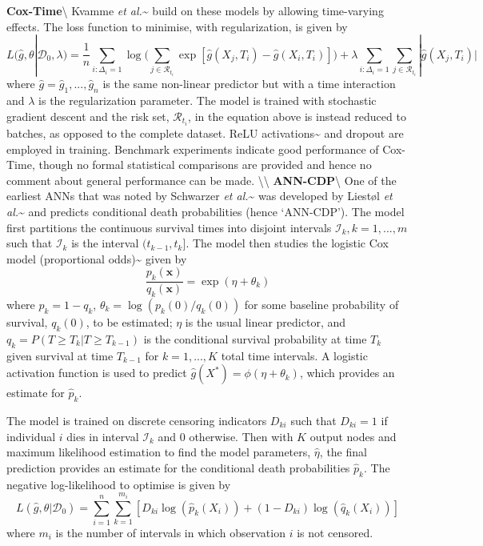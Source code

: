 \documentclass[
  letterpaper,
]{scrbook}
\theoremstyle{plain}
\theoremstyle{definition}
\theoremstyle{remark}
\begin{document}
\newpage

\noindent\textbf{Cox-Time}\label{mod:coxtime}\textbackslash{} Kvamme
\textit{et al.}{}\textasciitilde{}\cite{Kvamme2019a} build on these
models by allowing time-varying effects. The loss function to minimise,
with regularization, is given by \[
L(\hat{g}, \theta|\mathcal{D}_0, \lambda) = \frac{1}{n} \sum_{i:\Delta_i = 1} \log\Big(\sum_{j \in \mathcal{R}_{t_i}} \exp[\hat{g}(X_j,T_i) - \hat{g}(X_i, T_i)]\Big) + \lambda \sum_{i:\Delta_i=1}\sum_{j \in \mathcal{R}_{t_i}} |\hat{g}(X_j,T_i)|
\] where \(\hat{g}= \hat{g}_1,...,\hat{g}_n\) is the same non-linear
predictor but with a time interaction and \(\lambda\) is the
regularization parameter. The model is trained with stochastic gradient
descent and the risk set, \(\mathcal{R}_{t_i}\), in the equation above
is instead reduced to batches, as opposed to the complete dataset. ReLU
activations\textasciitilde{}\cite{Nair2010} and dropout are employed in
training. Benchmark experiments indicate good performance of Cox-Time,
though no formal statistical comparisons are provided and hence no
comment about general performance can be made.
\textbackslash\textbackslash{}
\textbf{ANN-CDP}\label{mod:anncdp}\textbackslash{} One of the earliest
ANNs that was noted by Schwarzer
\textit{et al.}\textasciitilde{}\cite{Schwarzer2000} was developed by
Liest\o l \textit{et al.}\textasciitilde{}\cite{Liestol1994} and
predicts conditional death probabilities (hence `ANN-CDP'). The model
first partitions the continuous survival times into disjoint intervals
\(\mathcal{I}_k, k = 1,...,m\) such that \(\mathcal{I}_k\) is the
interval \((t_{k-1}, t_k]\). The model then studies the logistic Cox
model (proportional odds)\textasciitilde{}\cite{Cox1972} given by \[
\frac{p_k(\mathbf{x})}{q_k(\mathbf{x})} = \exp(\eta + \theta_k)
\] where \(p_k = 1-q_k\), \(\theta_k = \log(p_k(0)/q_k(0))\) for some
baseline probability of survival, \(q_k(0)\), to be estimated; \(\eta\)
is the usual linear predictor, and
\(q_k = P(T \geq T_k | T \geq T_{k-1})\) is the conditional survival
probability at time \(T_k\) given survival at time \(T_{k-1}\) for
\(k = 1,...,K\) total time intervals. A logistic activation function is
used to predict \(\hat{g}(X^*) = \phi(\eta + \theta_k)\), which provides
an estimate for \(\hat{p}_k\).

The model is trained on discrete censoring indicators \(D_{ki}\) such
that \(D_{ki} = 1\) if individual \(i\) dies in interval
\(\mathcal{I}_k\) and \(0\) otherwise. Then with \(K\) output nodes and
maximum likelihood estimation to find the model parameters,
\(\hat{\eta}\), the final prediction provides an estimate for the
conditional death probabilities \(\hat{p}_k\). The negative
log-likelihood to optimise is given by \[
L(\hat{g}, \theta|\mathcal{D}_0) = \sum^n_{i=1}\sum^{m_i}_{k=1} [D_{ki}\log(\hat{p}_k(X_i)) + (1-D_{ki})\log(\hat{q}_k(X_i))]
\] where \(m_i\) is the number of intervals in which observation \(i\)
is not censored.
\end{document}
